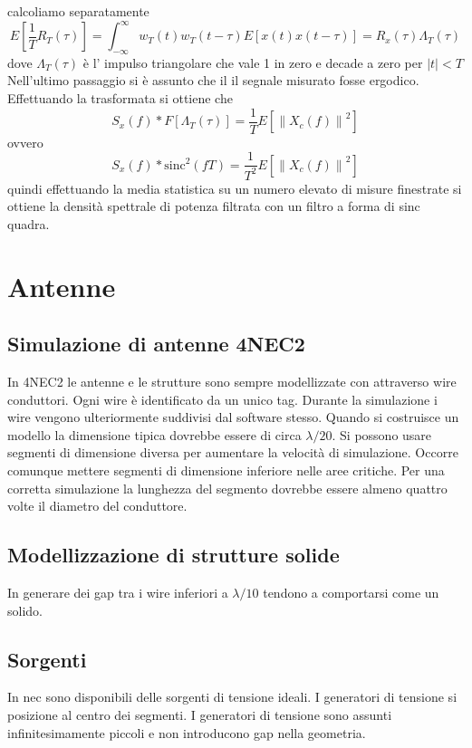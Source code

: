 \documentclass[10pt,a4paper]{book}
\begin{document}
calcoliamo separatamente 
\begin{equation}
E\left[ \frac{1}{T} R_T(\tau)\right ] = \int_{-\infty}^{\infty} w_T(t) w_T(t- \tau) E \left[  	x(t)x(t - \tau)\right] = R_x(\tau) \Lambda_{T}(\tau)
\end{equation}
dove $\Lambda_{T} (\tau)$ è l' impulso triangolare che vale 1 in zero e decade a zero per $|t| <T	$
Nell'ultimo passaggio si è assunto che il il segnale misurato fosse ergodico.  
Effettuando la trasformata si ottiene che
\begin{equation}
S_x(f)*F[\Lambda_{T} (\tau)] =  \frac{1}{T} E\left[ {\|X_c(f)\|}^2\right ]
\end{equation}
ovvero 
\begin{equation}
S_x(f)* \mathrm{sinc}^2\left(f T\right) =  \frac{1}{T^2} E\left[ {\|X_c(f)\|}^2\right ]
\end{equation}
quindi effettuando la media statistica su un numero elevato di misure finestrate si ottiene la densità spettrale di potenza filtrata con un filtro a forma di sinc quadra.


\chapter{Antenne}
\section{Simulazione di antenne 4NEC2}
In 4NEC2 le antenne e le strutture sono sempre modellizzate con attraverso wire conduttori. Ogni wire è identificato da un unico tag. Durante la simulazione i wire vengono ulteriormente suddivisi dal software stesso. Quando si costruisce un modello la dimensione tipica dovrebbe essere di circa $\lambda/20$. Si possono usare segmenti di dimensione diversa per aumentare la velocità di simulazione. Occorre comunque mettere segmenti di dimensione inferiore nelle aree critiche. Per una corretta simulazione la lunghezza del segmento dovrebbe essere almeno quattro volte il diametro del conduttore.
\section{Modellizzazione di strutture solide}
In generare dei gap tra i wire inferiori a $\lambda/10$ tendono a comportarsi come un solido.
\section{Sorgenti}
In nec sono disponibili delle sorgenti di tensione ideali. I generatori di tensione si posizione al centro  dei segmenti. I generatori di tensione sono assunti infinitesimamente piccoli e non introducono gap nella geometria.
\end{document}
